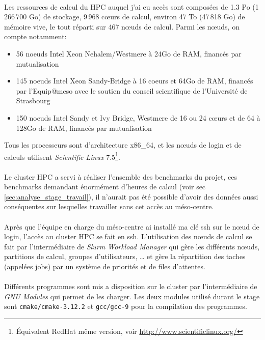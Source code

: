 \documentclass[a4paper,11pt,twoside,french,report]{../common/simplem}
\begin{document}
				\paragraph*{}
					Les ressources de calcul du \gls{HPC} auquel j'ai eu accès sont composées de 1.3 Po (1\,266\,700 Go) de stockage, 9\,968 cœurs de calcul, environ 47 To (47\,818 Go) de mémoire vive, le tout réparti sur 467 nœuds de calcul. Parmi les nœuds, on compte notamment:
					\begin{itemize}
						\item 56 noeuds Intel Xeon Nehalem/Westmere à 24Go de RAM, financés par mutualisation
						\item 145 noeuds Intel Xeon Sandy-Bridge à 16 coeurs et 64Go de RAM, financés par l'\gls{Equip@meso} avec le soutien du conseil scientifique de l'Université de Strasbourg
						\item 150 noeuds Intel Sandy et Ivy Bridge, Westmere de 16 ou 24 cœurs et de 64 à 128Go de RAM, financés par mutualisation
					\end{itemize}
					Tous les processeurs sont d'architecture x86\_64, et les nœuds de login et de calculs utilisent \textit{Scientific Linux} 7.5\footnote{Équivalent RedHat même version, voir \url{http://www.scientificlinux.org/}}.
				\paragraph*{}
					Le cluster \gls{HPC} a servi à réaliser l'ensemble des benchmarks du projet, ces benchmarks demandant énormément d'heures de calcul (voir sec \ref{sec:analyse_stage_travail}), il n'aurait pas été possible d'avoir des données aussi conséquentes sur lesquelles travailler sans cet accès au méso-centre.
				\paragraph*{}
					Après que l'équipe en charge du méso-centre ai installé ma clé ssh sur le nœud de login, l'accès au cluster \gls{HPC} se fait en ssh. L'utilisation des nœuds de calcul se fait par l'intermédiaire de \textit{Slurm Workload Manager} qui gère les différents nœuds, partitions de calcul, groupes d'utilisateurs, \ldots{} et gère la répartition des taches (appelées jobs) par un système de priorités et de files d'attentes.
				\paragraph*{}
					Différents programmes sont mis a disposition sur le cluster par l'intermédiaire de \textit{GNU Modules} qui permet de les charger. Les deux modules utilisé durant le stage sont \texttt{cmake/cmake-3.12.2} et \texttt{gcc/gcc-9} pour la compilation des programmes.
\end{document}
